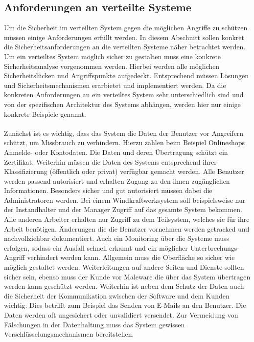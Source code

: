 \documentclass[utf8,biblatex]{lni}
\begin{document}
\subsection{Anforderungen an verteilte Systeme}
Um die Sicherheit im verteilten System gegen die möglichen Angriffe zu schützen müssen einige Anforderungen erfüllt werden. In diesem Abschnitt sollen
konkret die Sicherheitsanforderungen an die verteilten Systeme näher betrachtet werden. Um ein verteiltes System möglich sicher zu gestalten muss eine konkrete Sicherheitsanalyse vorgenommen werden.
 Hierbei werden alle möglichen Sicherheitslücken und Angriffspunkte aufgedeckt. 
Entsprechend müssen Lösungen und Sicherheitsmechanismen erarbietet und implementiert werden. Da die konkreten Anforderungen an ein verteiltes System sehr unterschiedlich sind und von der spezifischen Architektur 
des Systems abhängen, werden hier nur einige konkrete Beispiele genannt.
\\\\
Zunächst ist es wichtig, dass das System die Daten der Benutzer vor Angreifern schützt, um Missbrauch zu verhindern. Hierzu zählen beim Beispiel Onlineshops Anmelde- oder Kontodaten. Die Daten und deren Übertragung
schützt ein Zertifikat.
\newline
Weiterhin müssen die Daten des Systems entsprechend ihrer Klassifizierung (öffentlich oder privat) verfügbar gemacht werden. Alle Benutzer werden passend autorisiert und erhalten Zugang zu den ihnen zugänglichen Informationen. Besonders sicher und gut autorisiert müssen dabei die Administratoren werden.
Bei einem Windkraftwerksystem soll beispielsweise nur der Instandhalter und der Manager Zugriff auf das gesamte System bekommen. Alle anderen Arbeiter erhalten nur Zugriff zu dem Teilsystem, welches sie für ihre Arbeit benötigen.
 Änderungen die die Benutzer vornehmen
werden getracked und nachvollziehbar dokumentiert. Auch ein Monitoring über die Systeme muss erfolgen, sodass ein Ausfall schnell erkannt und ein möglicher Unterbrechungs-Angriff verhindert werden kann.
Allgemein muss die Oberfläche so sicher wie möglich gestaltet werden. Weiterleitungen auf andere Seiten und Dienste sollten sicher sein, ebenso muss der Kunde vor Maleware die über das System
übertragen werden kann geschützt werden.
Weiterhin ist neben dem Schutz der Daten auch die Sicherheit der Kommunikation zwischen der Software und dem Kunden wichtig. Dies betrifft zum Beispiel das Senden von E-Mails an den Benutzer. Die Daten werden oft ungesichert
oder unvalidiert versendet. 
Zur Vermeidung von Fälschungen in der Datenhaltung muss das System gewissen Verschlüsselungsmechanismen bereitstellen. 
\citet{Kriha.2008}
\end{document}
